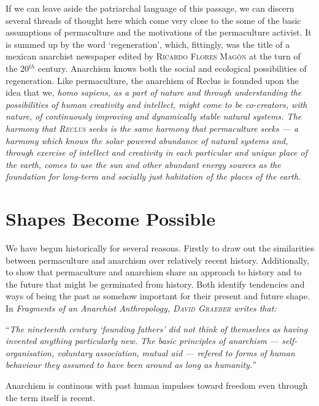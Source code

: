 \documentclass[a4paper, 11pt]{article}
\begin{document}
\begin{multicols*}{2}
If we can leave aside the patriarchal language of this passage, we can discern several threads of thought here which come very close to the some of the basic assumptions of permaculture and the motivations of the permaculture activist.  It is summed up by the word `regeneration', which, fittingly, was the title of a mexican anarchist newspaper edited by \textsc{Ricardo Flores Mag\`on} at the turn of the 20$^{th}$ century.  Anarchism knows both the social and ecological possibilities of regeneration. Like permaculture, the anarchism of Reclus is founded upon the idea that we, \em{homo sapiens}\em, as a part of nature and through understanding the possibilities of human creativity and intellect, might come to be co-creators, with nature, of continuously improving and dynamically stable natural systems.  The harmony that \textsc{Reclus} seeks is the same harmony that permaculture seeks --- a harmony which knows the solar powered abundance of natural systems and, through exercise of intellect and creativity in each particular and unique place of the earth, comes to use the sun and other abundant energy sources as the foundation for long-term and socially just habitation of the places of the earth.

\section*{Shapes Become Possible}
We have begun historically for several reasons.  Firstly to draw out the similarities between permaculture and anarchism over relatively recent history.  Additionally, to show that permaculture and anarchism share an approach to history and to the future that might be germinated from history.  Both identify tendencies and ways of being the past as somehow important for their present and future shape.  In \em{Fragments of an Anarchist Anthropology}\em, \textsc{David Graeber} writes that:

\vspace{1mm}
``\em{The nineteenth century `founding fathers' did not think of themselves as having invented anything particularly new.  The basic principles of anarchism --- self-organisation, voluntary association, mutual aid --- refered to forms of human behaviour they assumed to have been around as long as humanity.}\em''
\vspace{1mm}

Anarchism is continous with past human impulses toward freedom even through the term itself is recent.


\end{multicols*}
\end{document}
